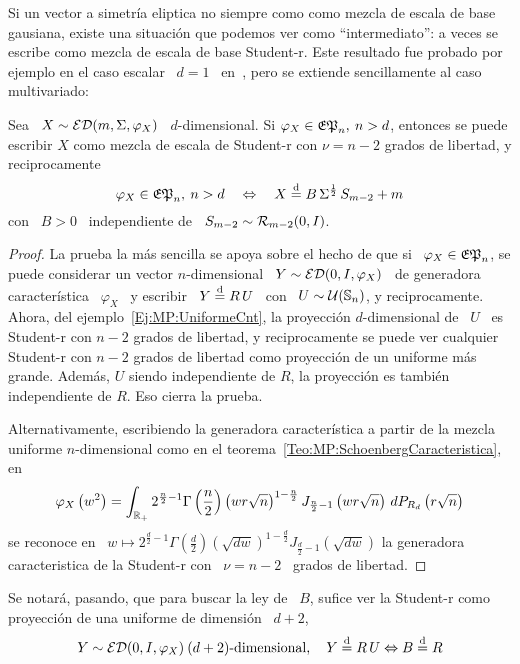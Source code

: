 Si un vector a simetr\'ia eliptica no siempre como como mezcla de escala de base
gausiana, existe una situaci\'on que  podemos ver como ``intermediato'': a veces
se escribe como  mezcla de escala de base Student-r.  Este resultado fue probado
por ejemplo  en el  caso escalar  \ $d=1$ \  en~\cite{Wil56, KeiSte74},  pero se
extiende sencillamente al caso multivariado:
%
\begin{teorema}
%
  Sea \  $X \sim \mathcal{ED}(m,\Sigma,\varphi_X)$  \ $d$-dimensional. Si  $\varphi_X \in
  \mathfrak{EP}_n, \: n  > d$, entonces se  puede escribir $X$ como mezcla  de escala de
  Student-r con $\nu = n-2$ grados de libertad, y reciprocamente
  \[
  \varphi_X \in  \mathfrak{EP}_n, \:  n > d  \quad \Leftrightarrow  \quad X \stackrel{\mathrm{d}}{=}  B \,
  \Sigma^{\frac12} \, S_{m-2} + m
  \]
  con \ $B > 0$ \ independiente de \ $S_{m-2} \sim \mathcal{R}_{m-2}(0,I)$.
\end{teorema}
%
\begin{proof}
  La prueba la m\'as sencilla se apoya sobre el hecho de que si \ $\varphi_X \in
  \mathfrak{EP}_n$,   se  puede  considerar   un  vector   $n$-dimensional  \   $Y  \sim
  \mathcal{ED}(0,I,\varphi_X)$  \  de  generadora  caracter\'istica  \  $\varphi_X$  \  y
  escribir \  $Y \stackrel{\mathrm{d}}{=}  R \, U$ \  con \  $U \sim \mathcal{U}(\mathbb{S}_n)$,  y reciprocamente.
  Ahora, del ejemplo~\ref{Ej:MP:UniformeCnt}, la proyecci\'on $d$-dimensional de
  \ $U$ \  es Student-r con $n-2$ grados de libertad,  y reciprocamente se puede
  ver cualquier Student-r  con $n-2$ grados de libertad  como proyecci\'on de un
  uniforme  m\'as  grande.   Adem\'as,  $U$  siendo  independiente  de  $R$,  la
  proyecci\'on es tambi\'en independiente de $R$. Eso cierra la prueba.

  Alternativamente, escribiendo  la generadora  caracter\'istica a partir  de la
  mezcla        uniforme         $n$-dimensional        como        en        el
  teorema~\ref{Teo:MP:SchoenbergCaracteristica}, en
  \[
  \varphi_X\left(  w^2 \right)  = \int_{\mathbb{R}_+}  2^{\frac{n}{2}-1} \Gamma\left(
    \frac{n}{2}   \right)   \left(    w   r   \sqrt{n}   \right)^{1-\frac{n}{2}}
  J_{\frac{n}{2}-1}\left(  w r  \sqrt{n}  \right) \,  dP_{R_d}\left( r  \sqrt{n}
  \right)
  \]
  se  reconoce  en \  $  w  \mapsto  2^{\frac{d}{2}-1} \Gamma\left(  \frac{d}{2}
  \right)  \left(  \sqrt{d  w}  \right)^{1-\frac{d}{2}}  J_{\frac{d}{2}-1}\left(
    \sqrt{d w} \right)$ la generadora  caracteristica de la Student-r con \ $\nu
  = n-2$ \ grados de libertad.
\end{proof}
%
Se notar\'a, pasando, que  para buscar la ley de \ $B$,  sufice ver la Student-r
como proyecci\'on de una uniforme de dimensi\'on \ $d+2$, \ie
%
\[
Y  \sim  \mathcal{ED}(0,I,\varphi_X) \:  (d+2)\mbox{-dimensional},  \quad  Y  \stackrel{\mathrm{d}}{=} R \, U
\Leftrightarrow B \stackrel{\mathrm{d}}{=} R
\]

